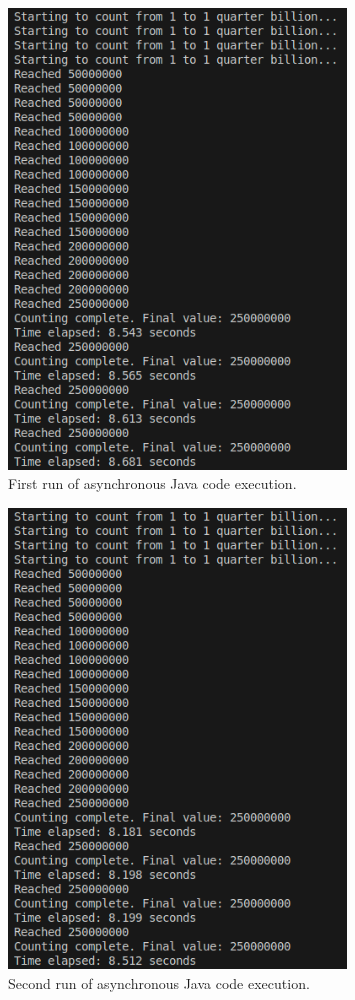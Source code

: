 \documentclass[12pt,a4paper]{article}
\begin{document}
\begin{figure}[htbp]
    \centering
    \includegraphics[width=0.8\textwidth]{../async_records/results_java/result_1.png}
    \caption{First run of asynchronous Java code execution.}
    \label{fig:Java-async-runtime-1}
\end{figure}

\begin{figure}[htbp]
    \centering
    \includegraphics[width=0.8\textwidth]{../async_records/results_java/result_2.png}
    \caption{Second run of asynchronous Java code execution.}
    \label{fig:Java-async-runtime-2}
\end{figure}
\end{document}
